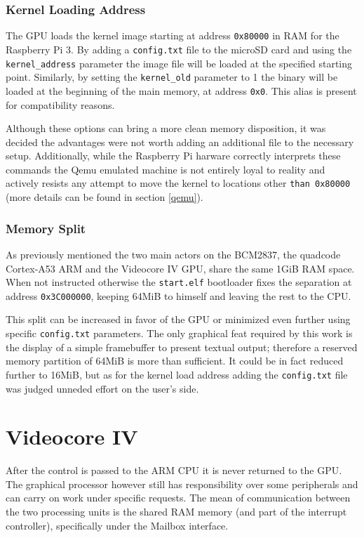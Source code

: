 \documentclass[12pt,a4paper,openright,twoside]{report}
\begin{document}
\subsubsection{Kernel Loading Address}
The GPU loads the kernel image starting at address {\tt 0x80000} in RAM for the
Raspberry Pi 3. By adding a {\tt config.txt} file to the microSD card and using
the {\tt kernel\_address} parameter the image file will be loaded at the specified
starting point. Similarly, by setting the {\tt kernel\_old} parameter to 1 the binary
will be loaded at the beginning of the main memory, at address {\tt 0x0}. This
alias is present for compatibility reasons.

Although these options can bring a more clean memory disposition, it was decided
the advantages were not worth adding an additional file to the necessary setup.
Additionally, while the Raspberry Pi harware correctly interprets these commands
the Qemu emulated machine is not entirely loyal to reality and actively resists
any attempt to move the kernel to locations other {\tt than 0x80000} (more details can
be found in section \ref{qemu}).

\subsubsection{Memory Split}
As previously mentioned the two main actors on the BCM2837, the quadcode Cortex-A53 ARM
and the Videocore IV GPU, share the same 1GiB RAM space. When not instructed otherwise
the {\tt start.elf} bootloader fixes the separation at address {\tt 0x3C000000}, keeping
64MiB to himself and leaving the rest to the CPU.

This split can be increased in favor of the GPU or minimized even further using
specific {\tt config.txt} parameters. The only graphical feat required by this work
is the display of a simple framebuffer to present textual output; therefore
a reserved memory partition of 64MiB is more than sufficient.
It could be in fact reduced further to 16MiB, but as for the kernel load address 
adding the {\tt config.txt} file was judged unneded effort on the user's side.

\section{Videocore IV}
After the control is passed to the ARM CPU it is never returned to the GPU.
The graphical processor however still has responsibility over some peripherals
and can carry on work under specific requests. The mean of communication 
between the two processing units is the shared RAM memory (and part of the interrupt
controller), specifically under the Mailbox interface.
\end{document}
